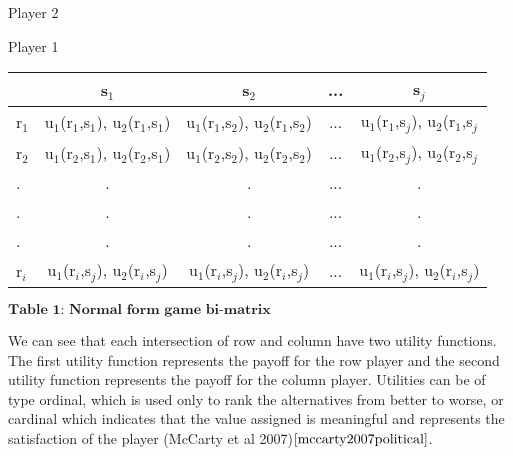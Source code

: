 \documentclass{article}
\begin{document}
\begin{center}
Player 2

Player 1
\begin{tabular}{|l|c|c|c|c|}
\hline
& s$_1$ & s$_2$ & ... & s$_j$\\ 
\hline
r$_1$ & u$_1$(r$_1$,s$_1$), u$_2$(r$_1$,s$_1$) & u$_1$(r$_1$,s$_2$), u$_2$(r$_1$,s$_2$) & ... &  u$_1$(r$_1$,s$_j$), u$_2$(r$_1$,s$_j$\\
\hline
r$_2$ & u$_1$(r$_2$,s$_1$), u$_2$(r$_2$,s$_1$) & u$_1$(r$_2$,s$_2$), u$_2$(r$_2$,s$_2$) & ... &  u$_1$(r$_2$,s$_j$), u$_2$(r$_2$,s$_j$\\
\hline
. & . & . & ... & .\\
. & . & . & ... & .\\
. & . & . & ... & .\\
\hline
r$_i$ & u$_1$(r$_i$,s$_j$), u$_2$(r$_i$,s$_j$) & u$_1$(r$_i$,s$_j$), u$_2$(r$_i$,s$_j$) & ... &  u$_1$(r$_i$,s$_j$), u$_2$(r$_i$,s$_j$)\\
\hline
\end{tabular}



$\textbf{Table 1: Normal form game bi-matrix}$
\end{center}

We can see that each intersection of row and column have two utility functions. The first utility function represents the payoff for the row player and the second utility function represents the payoff for the column player. Utilities can be of type ordinal, which is used only to rank the alternatives from better to worse, or cardinal which indicates that the value assigned is meaningful and represents the satisfaction of the player (McCarty et al 2007)$\cite{mccarty2007political}$.
\end{document}
